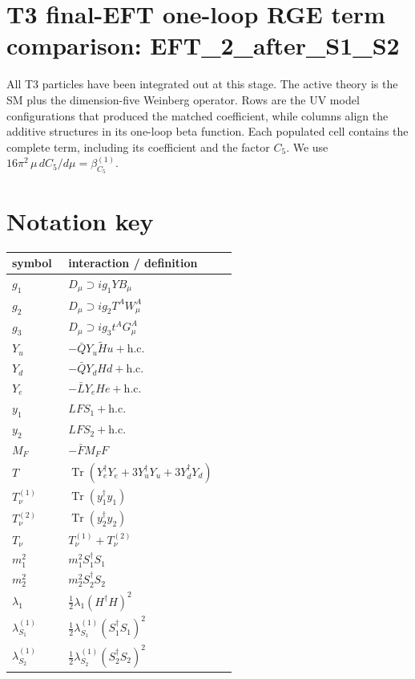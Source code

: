 \documentclass[8pt]{article}
\begin{document}
\begin{landscape}
\section*{T3 final-EFT one-loop RGE term comparison: EFT\_2\_after\_S1\_S2}
All T3 particles have been integrated out at this stage. The active theory is the SM plus the dimension-five Weinberg operator. Rows are the UV model configurations that produced the matched coefficient, while columns align the additive structures in its one-loop beta function. Each populated cell contains the complete term, including its coefficient and the factor $C_5$.
\medskip
We use $16\pi^2\,\mu\,dC_5/d\mu=\beta_{C_5}^{(1)}$.
\section*{Notation key}
\begin{longtable}{@{}p{0.23\linewidth}p{0.69\linewidth}@{}}
\toprule
symbol & interaction / definition \\
\midrule
$g_1$ & $D_\mu\supset i g_1YB_\mu$ \\
$g_2$ & $D_\mu\supset i g_2T^AW_\mu^A$ \\
$g_3$ & $D_\mu\supset i g_3t^AG_\mu^A$ \\
$Y_u$ & $-\bar QY_u\widetilde Hu+\mathrm{h.c.}$ \\
$Y_d$ & $-\bar QY_dHd+\mathrm{h.c.}$ \\
$Y_e$ & $-\bar LY_eHe+\mathrm{h.c.}$ \\
$y_1$ & $LFS_1+\mathrm{h.c.}$ \\
$y_2$ & $LFS_2+\mathrm{h.c.}$ \\
$M_F$ & $-\bar FM_FF$ \\
$T$ & $\operatorname{Tr}(Y_e^\dagger Y_e+3Y_u^\dagger Y_u+3Y_d^\dagger Y_d)$ \\
$T_\nu^{(1)}$ & $\operatorname{Tr}(y_1^\dagger y_1)$ \\
$T_\nu^{(2)}$ & $\operatorname{Tr}(y_2^\dagger y_2)$ \\
$T_\nu$ & $T_\nu^{(1)}+T_\nu^{(2)}$ \\
$m_1^2$ & $m_1^2S_1^\dagger S_1$ \\
$m_2^2$ & $m_2^2S_2^\dagger S_2$ \\
$\lambda_1$ & $\frac12\lambda_1(H^\dagger H)^2$ \\
$\lambda_{S_1}^{(1)}$ & $\frac12\lambda_{S_1}^{(1)}(S_1^\dagger S_1)^2$ \\
$\lambda_{S_2}^{(1)}$ & $\frac12\lambda_{S_2}^{(1)}(S_2^\dagger S_2)^2$ \\

\end{longtable}
\end{landscape}
\end{document}
